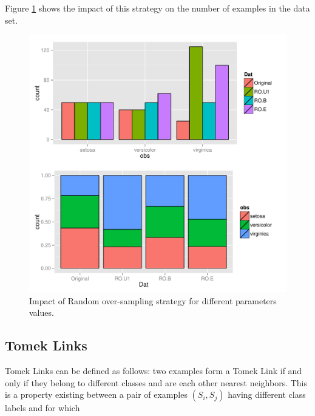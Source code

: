 \documentclass[10pt,a4paper]{article}\usepackage[]{graphicx}\usepackage[]{color}
\makeatletter
\def\maxwidth{ %
  \ifdim\Gin@nat@width>\linewidth
    \linewidth
  \else
    \Gin@nat@width
  \fi
}
\newenvironment{knitrout}{}{} %
\makeatother
\begin{document}
Figure \ref{fig:Iris_RO2} shows the impact of this strategy on the number of examples in the data set.

\begin{knitrout}\footnotesize
{}\color{fgcolor}\begin{figure}

{\centering \includegraphics[width=\maxwidth]{figures/UBL-Iris_RO2-1} 

}

\caption[Impact of Random over-sampling strategy for different parameters values]{Impact of Random over-sampling strategy for different parameters values.}\label{fig:Iris_RO2}
\end{figure}


\end{knitrout}


\subsection{Tomek Links}\label{sec:Tomek}

Tomek Links \cite{tomek1976two} can be defined as follows: two examples form a Tomek Link if and only if they belong to different classes and are each other nearest neighbors. This is a property existing between a pair of examples $(S_i, S_j)$ having different class labels and for which 
\end{document}
